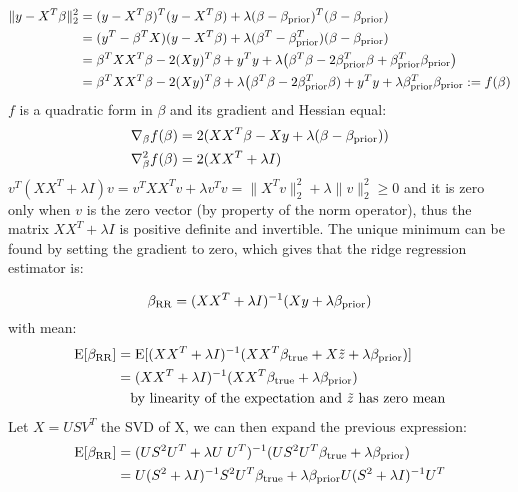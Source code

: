 \documentclass[12pt,twoside]{article}
\begin{document}
\begin{enumerate}
\begin{enumerate}
\medskip
 
 \begin{align*}
 	\| y - X^T \beta \|_2^2		&=	(y - X^T \beta)^T (y - X^T \beta) + \lambda (\beta - \beta_{\operatorname{prior}})^T (\beta - \beta_{\operatorname{prior}}) \\
							&=	(y^T - \beta^T X)  (y - X^T \beta) + \lambda (\beta^T - \beta_{\operatorname{prior}}^T) (\beta - \beta_{\operatorname{prior}}) \\
							&=	\beta^T X X^T \beta -2 (X y)^T \beta + y^T y + \lambda \big( \beta^T \beta -2  \beta_{\operatorname{prior}}^T \beta +  \beta_{\operatorname{prior}}^T \beta_{\operatorname{prior}} \big) \\
							&=	\beta^T X X^T \beta -2 (X y)^T \beta + \lambda \big( \beta^T \beta -2  \beta_{\operatorname{prior}}^T \beta) +  y^T y +  \lambda  \beta_{\operatorname{prior}}^T \beta_{\operatorname{prior}} := f(\beta)
 \end{align*}    
 $f$ is a quadratic form in $\beta$ and its gradient and Hessian equal:
 \begin{align*}
 	\nabla_{\beta} f(\beta)		&=	2 (X X^T \beta - X y +  \lambda (\beta - \beta_{\operatorname{prior}}))  \\
	\nabla_{\beta}^2 f(\beta)		&=	2 (X X^T  +  \lambda I) 
 \end{align*}    
  $v^T (X X^T  +  \lambda I) v  = v^T X X^T v + \lambda v^T v = \|X^T v \|_2^2 + \lambda \| v \|_2^2 \ge 0$ and it is zero only when $v$ is the zero vector (by property of the norm operator), thus the matrix $X X^T  +  \lambda I$ is positive definite
  and invertible. The unique minimum can be found by setting the gradient to zero, which gives that the ridge regression estimator is:
  
  $$\beta_{\operatorname{RR}}  =   (X X^T  +  \lambda I)^{-1} (X y + \lambda \beta_{\operatorname{prior}})$$
  with mean:
\begin{align*}
  	\mathrm{E}[\beta_{\operatorname{RR}} ]		&= 		\mathrm{E}[ (X X^T  +  \lambda I)^{-1} (X X^T \beta_{\operatorname{true}} + X \tilde{ z } +  \lambda \beta_{\operatorname{prior}})] \\
						&=		 (X X^T  +  \lambda I)^{-1} (X X^T \beta_{\operatorname{true}}  + \lambda \beta_{\operatorname{prior}}) \\
						&	\text{ ~ by linearity of the expectation and } \tilde{ z } \text{ has zero mean}
\end{align*} 
Let $X=U S V^T$ the SVD of X, we can then expand the previous expression:
\begin{align*}
	\mathrm{E}[\beta_{\operatorname{RR}} ]		&=	(U S^2 U^T + \lambda U \; U^T)^{-1}	(U S^2 U^T \beta_{\operatorname{true}}  + \lambda \beta_{\operatorname{prior}}) \\
						&=	U (S^2 + \lambda I)^{-1} S^2 U^T  \beta_{\operatorname{true}}  +  \lambda \beta_{\operatorname{prior}} U (S^2 + \lambda I)^{-1} U^T
\end{align*} 


\end{enumerate}
\end{enumerate}
\end{document}
